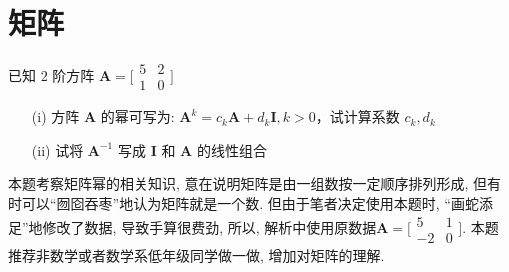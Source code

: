 \documentclass[a4paper, 12pt, UTF8]{ctexart}
\begin{document}
\clearpage
\section{矩阵}

\begin{exa}
    已知 $2$ 阶方阵 $
        \boldsymbol{A} = \Biggl[
        \begin{matrix}
            5 & 2 \\ 1 & 0
        \end{matrix}\Biggr]$ 
    \begin{itemize}
        \item[(i)] 方阵 $\boldsymbol{A}$ 的幂可写为: $\boldsymbol{A}^{k} = c_{k}\boldsymbol{A} + d_{k}\boldsymbol{I}, k > 0$，试计算系数 $c_{k},d_{k}$
        \item[(ii)] 试将 $\boldsymbol{A}^{-1}$ 写成 $\boldsymbol{I}$ 和 $\boldsymbol{A}$ 的线性组合
    \end{itemize}
\end{exa}

\begin{lem}{}{}
    {\adkaiti 本题考察矩阵幂的相关知识, 意在说明矩阵是由一组数按一定顺序排列形成, 但有时可以``囫囵吞枣''地认为矩阵就是一个数. 但由于笔者决定使用本题时, ``画蛇添足''地修改了数据, 导致手算很费劲, 所以, 解析中使用原数据$
\boldsymbol{A} = \bigl[\begin{smallmatrix}
          5 & 1\\
          -2& 0
      \end{smallmatrix} \bigr]
$. 本题推荐非数学或者数学系低年级同学做一做, 增加对矩阵的理解.}
\end{lem}
\end{document}
